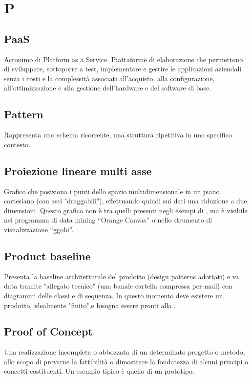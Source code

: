 \section*{P}
\markright{}
\subsection*{PaaS}
Acronimo di Platform as a Service. Piattaforme di elaborazione che permettono di sviluppare, sottoporre a test, implementare e gestire le applicazioni aziendali senza i costi e la complessità associati all'acquisto, alla configurazione, all'ottimizzazione e alla gestione dell'hardware e del software di base. 

\subsection*{Pattern}
Rappresenta uno schema ricorrente, una struttura ripetitiva in uno specifico contesto. 

\subsection*{Proiezione lineare multi asse}
Grafico che posiziona i punti dello spazio multidimensionale in un piano cartesiano (con assi "draggabili"), effettuando quindi sui dati una riduzione a due dimensioni. Questo grafico non è tra quelli presenti negli esempi di , ma è visibile nel programma di data mining “Orange Canvas” o nello strumento di visualizzazione “ggobi”.

\subsection*{Product baseline}
Presenta la baseline architetturale del prodotto (design patterns adottati) e va data tramite "allegato tecnico" (una banale cartella compressa per mail) con diagrammi delle classi e di sequenza. In questo momento deve esistere un prodotto, idealmente "finito",e bisogna essere pronti alla .

\subsection*{Proof of Concept}
Una realizzazione incompleta o abbozzata di un determinato progetto o metodo, allo scopo di provarne la fattibilità o dimostrare la fondatezza di alcuni principi o concetti costituenti. Un esempio tipico è quello di un prototipo. 


